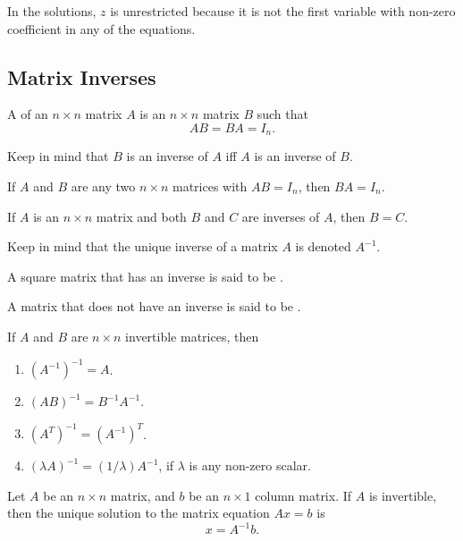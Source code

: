 In the solutions, $z$ is unrestricted because it is not the first variable with non-zero coefficient in any of the equations.

\subsection{Matrix Inverses}
\begin{definition}
  A  of an $n \times n$ matrix $A$ is an $n \times n$ matrix $B$ such that
  \begin{equation*}
     AB = BA = I_{n}.
  \end{equation*}
\end{definition}

Keep in mind that $B$ is an inverse of $A$ iff $A$ is an inverse of $B$.

\begin{theorem}
  If $A$ and $B$ are any two $n \times n$ matrices with $AB = I_{n}$, then $BA = I_{n}$.
\end{theorem}

\begin{theorem}[Uniqueness]
  If $A$ is an $n \times n$ matrix and both $B$ and $C$ are inverses of $A$, then $B = C$.
\end{theorem}

Keep in mind that the unique inverse of a matrix $A$ is denoted $A^{-1}$.

\begin{definition}
  A square matrix that has an inverse is said to be .

  A matrix that does not have an inverse is said to be .
\end{definition}

\begin{theorem}
  If $A$ and $B$ are $n \times n$ invertible matrices, then
  \begin{enumerate}
    \item $\left(A^{-1}\right)^{-1} = A$.
    \item $\left(AB\right)^{-1} = B^{-1}A^{-1}$.
    \item $\left(A^{T}\right)^{-1} = \left(A^{-1}\right)^{T}$.
    \item $\left(\lambda A\right)^{-1} = \left(1/\lambda\right)A^{-1}$, if $\lambda$ is any non-zero scalar.
  \end{enumerate}
\end{theorem}

\begin{theorem}
  Let $A$ be an $n \times n$ matrix, and $b$ be an $n \times 1$ column matrix. 
  If $A$ is invertible, then the unique solution to the matrix equation $Ax = b$ is
  \begin{equation*}
    x = A^{-1}b.
  \end{equation*}
\end{theorem}

